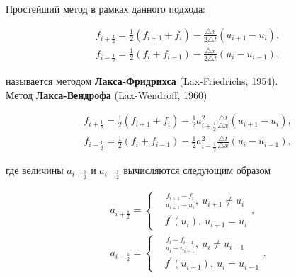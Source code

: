 \documentclass[12pt,a4paper]{article}
\begin{document}
		Простейший метод в рамках данного подхода:
		
		\begin{equation}
			\begin{split}
				&f_{i+\frac{1}{2}} = \frac{1}{2} \left( f_{i+1} + f_{i} \right) - \frac{\triangle x}{2 \triangle t} \left( u_{i+1} - u_{i} \right), \\
				&f_{i-\frac{1}{2}} = \frac{1}{2} \left( f_{i} + f_{i-1} \right) - \frac{\triangle x}{2 \triangle t} \left( u_{i} - u_{i-1} \right),
			\end{split}
		\end{equation}

		называется методом \textbf{Лакса-Фридрихса} (Lax-Friedrichs, 1954).\\
		
		Метод \textbf{Лакса-Вендрофа} (Lax-Wendroff, 1960)

		\begin{equation}
			\begin{split}
				&f_{i+\frac{1}{2}} = \frac{1}{2} \left( f_{i+1} + f_{i} \right) - \frac{1}{2} a^{2}_{i+\frac{1}{2}} \frac{\triangle t}{\triangle x} \left( u_{i+1} - u_{i} \right), \\
				&f_{i-\frac{1}{2}} = \frac{1}{2} \left( f_{i} + f_{i-1} \right) - \frac{1}{2} a^{2}_{i-\frac{1}{2}} \frac{\triangle t}{\triangle x} \left( u_{i} - u_{i-1} \right),
			\end{split}
		\end{equation}

		где величины $a_{i+\frac{1}{2}}$ и $a_{i-\frac{1}{2}}$ вычисляются следующим образом

		\begin{equation}
			\begin{split}
				&a_{i+\frac{1}{2}} =
					\begin{cases}
						&\frac{f_{i+1} - f_{i}}{u_{i+1} - u_{i}}, \: u_{i+1} \neq u_{i} \\
						&f^{\prime} \left( u_{i} \right), \: u_{i+1} = u_{i}
					\end{cases}, \\
				&a_{i-\frac{1}{2}} =
					\begin{cases}
						&\frac{f_{i} - f_{i-1}}{u_{i} - u_{i-1}}, \: u_{i} \neq u_{i-1} \\
						&f^{\prime} \left( u_{i-1} \right), \: u_{i} = u_{i-1}
					\end{cases}.
			\end{split}
		\end{equation}
\end{document}
